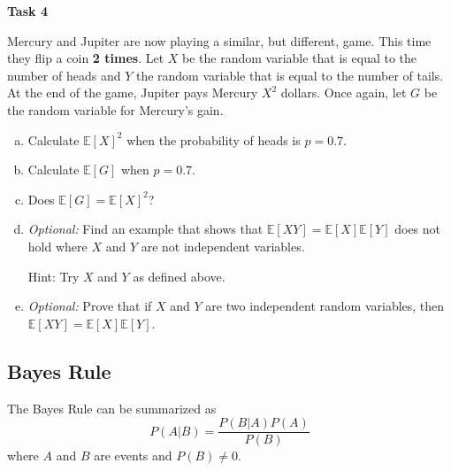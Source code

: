 \documentclass[12pt,letterpaper]{article}
\newenvironment{22enumerate}{\begin{enumerate}[a.]\itemsep0em}{\end{enumerate}}
\begin{document}
\textbf{Task 4}

Mercury and Jupiter are now playing a similar, but different, game. This time they flip a coin \textbf{2 times}. Let $X$ be the random variable that is equal to the number of heads and $Y$ the random variable that is equal to the number of tails. At the end of the game, Jupiter pays Mercury $X^2$ dollars. Once again, let $G$ be the random variable for Mercury's gain.
\begin{22enumerate}
    \item Calculate $\mathbb{E}[X]^2$ when the probability of  heads is $p = 0.7$.
    \begin{mdframed} \vspace{1cm} \end{mdframed}
    
    \item Calculate $\mathbb{E}[G]$ when $p = 0.7$.
    \begin{mdframed} \vspace{1cm} \end{mdframed}
    
    \item Does $\mathbb{E}[G]=\mathbb{E}[X]^2$? 
    \begin{mdframed} \vspace{1cm} \end{mdframed}
    
    \item \textit{Optional:} Find an example that shows that $\mathbb{E}[XY] = \mathbb{E}[X]\mathbb{E}[Y]$ does not hold where $X$ and $Y$ are not independent variables.
    
    Hint: Try $X$ and $Y$ as defined above.
    \begin{mdframed} \vspace{2cm} \end{mdframed}
    
    \item \textit{Optional:} Prove that if $X$ and $Y$ are two independent random variables, then $\mathbb{E}[XY]=\mathbb{E}[X]\mathbb{E}[Y]$.
    \begin{mdframed} \vspace{2cm} \end{mdframed}
\end{22enumerate}

\newpage

\subsection*{Bayes Rule}
The Bayes Rule can be summarized as
$$P(A|B) = \frac{P(B|A)P(A)}{P(B)}$$
where $A$ and $B$ are events and $P(B) \neq 0$.
\end{document}
